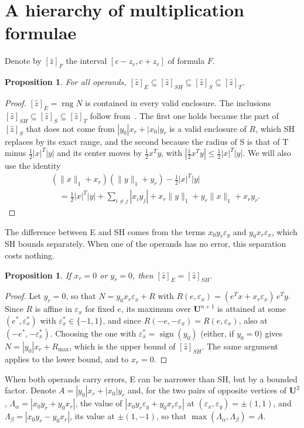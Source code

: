 \documentclass[10pt]{article}
\newtheorem{propo}[theorem]{Proposition}
\theoremstyle{definition}
\newcommand{\U}{\mathbf{U}}
\newcommand{\eps}{\varepsilon}
\newcommand{\ex}{\eps_x}
\newcommand{\ey}{\eps_y}
\newcommand{\rng}{\operatorname{rng}}
\begin{document}
\section{A hierarchy of multiplication formulae}
\label{sec:hierarchy}

Denote by $[\hat z]_F$ the interval $[c-z_r,c+z_r]$ of formula $F$.

\begin{propo}
\label{prop:chain}
For all operands, $[\hat z]_E \subseteq [\hat z]_{SH}\subseteq[\hat z]_S\subseteq[\hat z]_T$.
\end{propo}
\begin{proof}
$[\hat z]_E=\rng N$ is contained in every valid enclosure. The inclusions $[\hat z]_{SH}\subseteq[\hat z]_S\subseteq[\hat z]_T$ follow from~\cite[Prop.~3]{skalna2017new}. The first one holds because the part of $[\hat z]_S$ that does not come from $|y_0|x_r+|x_0|y_r$ is a valid enclosure of $R$, which SH replaces by its exact range, and the second because the radius of S is that of T minus $\tfrac12|x|^T|y|$ and its center moves by $\tfrac12x^Ty$, with $|\tfrac12x^Ty|\le\tfrac12|x|^T|y|$. We will also use the identity
\[
\begin{aligned}&(\|x\|_1+x_r)(\|y\|_1+y_r) - \tfrac12|x|^T|y|\\ &\quad= \tfrac12|x|^T|y|+\sum_{i\ne j}|x_iy_j| + x_r\|y\|_1+y_r\|x\|_1+x_ry_r .\end{aligned}
\]
\end{proof}

The difference between E and SH comes from the terms $x_0y_r\ey$ and $y_0x_r\ex$, which SH bounds separately. When one of the operands has no error, this separation costs nothing.

\begin{propo}
\label{prop:oneerror}
If $x_r=0$ or $y_r=0$, then $[\hat z]_E=[\hat z]_{SH}$.
\end{propo}
\begin{proof}
Let $y_r=0$, so that $N = y_0x_r\ex + R$ with $R(e,\ex)=(e^Tx+x_r\ex)\,e^Ty$. Since $R$ is affine in $\ex$ for fixed $e$, its maximum over $\U^{n+1}$ is attained at some $(e^*,\ex^*)$ with $\ex^*\in\{-1,1\}$, and since $R(-e,-\ex)=R(e,\ex)$, also at $(-e^*,-\ex^*)$. Choosing the one with $\ex^*=\operatorname{sign}(y_0)$ (either, if $y_0=0$) gives $N = |y_0|x_r + R_{\max}$, which is the upper bound of $[\hat z]_{SH}$. The same argument applies to the lower bound, and to $x_r=0$.
\end{proof}

When both operands carry errors, E can be narrower than SH, but by a bounded factor. Denote $A=|y_0|x_r+|x_0|y_r$ and, for the two pairs of opposite vertices of $\U^2$, $\Lambda_\alpha=|x_0y_r+y_0x_r|$, the value of $|x_0y_r\ey+y_0x_r\ex|$ at $(\ex,\ey)=\pm(1,1)$, and $\Lambda_\beta=|x_0y_r-y_0x_r|$, its value at $\pm(1,-1)$, so that $\max(\Lambda_\alpha,\Lambda_\beta)=A$.
\end{document}
